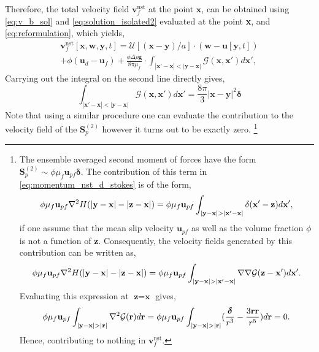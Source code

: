 Therefore, the total velocity field $\textbf{v}^\text{nst}_f$ at the point $\textbf{x}$, can be obtained using \ref{eq:v_b_sol} and \ref{eq:solution_isolated2} evaluated at the point \textbf{x}, and  \ref{eq:reformulation}, which yields,  
\begin{multline}
    \textbf{v}^\text{nst}_f [\textbf{x},\textbf{w},\textbf{y},t]
    =
    \mathcal{U}[(\textbf{x} - \textbf{y})/a]\cdot 
    (\textbf{w}- \textbf{u}[\textbf{y},t])
    \\
    +
    \phi(\textbf{u}_d - \textbf{u}_f)
    + 
    \frac{\phi\Delta \rho \textbf{g}}{8\pi \mu_f}\cdot 
    \int_{|\textbf{x}'-\textbf{x}|< |\textbf{y}- \textbf{x}|}
    \mathcal{G}(\textbf{x},\textbf{x}')
    d\textbf{x}',
\end{multline}
Carrying out the integral on the second line directly gives,
\begin{equation}
    \int_{|\textbf{x}'-\textbf{x}|< |\textbf{y}- \textbf{x}|}
    \mathcal{G}(\textbf{x},\textbf{x}')
    d\textbf{x}'
    = \frac{8\pi}{3}|\textbf{x}- \textbf{y}|^2\bm\delta
\end{equation}
Note that using a similar procedure one can evaluate the contribution to the velocity field of the $\textbf{S}_p^{(2)}$ however it turns out to be exactly zero.
\footnote{
    The ensemble averaged second moment of forces have the form $\textbf{S}_p^{(2)} \sim \phi \mu_f \textbf{u}_{pf} \bm\delta$. 
    The contribution of this term in \ref{eq:momentum_nst_d_stokes} is of the form, 
    \begin{equation*}
        \phi \mu_f \textbf{u}_{pf} \mathbf{\nabla}^2  H(|\textbf{y}- \textbf{x}| - |\textbf{z} -\textbf{x}|)
        =  \phi \mu_f \textbf{u}_{pf} \int_{|\textbf{y} - \textbf{x}| > |\textbf{x}' - \textbf{x}|}
        \delta(\textbf{x}'-\textbf{z})
        d\textbf{x}',
    \end{equation*}
    if one assume that the mean slip velocity $\textbf{u}_{pf}$ as well as the volume fraction $\phi$ is not a function of \textbf{z}. 
    Consequently, the velocity fields generated by this contribution can be written as, 
    \begin{equation*}
        \phi \mu_f \textbf{u}_{pf} \mathbf{\nabla}^2  H(|\textbf{y}- \textbf{x}| - |\textbf{z} -\textbf{x}|)
        =  \phi \mu_f \textbf{u}_{pf} \int_{|\textbf{y} - \textbf{x}| > |\textbf{x}' - \textbf{x}|}
        \mathbf{\nabla}\mathbf{\nabla}\mathcal{G}(\textbf{z} - \textbf{x}')
        d\textbf{x}'. 
    \end{equation*}     
    Evaluating this expression at $\textbf{z} = \textbf{x}$ gives, 
    \begin{equation*}
        \phi \mu_f \textbf{u}_{pf} \int_{|\textbf{y} - \textbf{x}| > |\textbf{r}|}
        \mathbf{\nabla}^2\mathcal{G}(\textbf{r})
        d\textbf{r} 
        = 
        \phi \mu_f \textbf{u}_{pf} \int_{|\textbf{y} - \textbf{x}| > |\textbf{r}|}
        (\frac{\bm\delta}{r^3} - \frac{3\textbf{rr}}{r^5})
        d\textbf{r} 
        = 0. 
    \end{equation*}     
    Hence, contributing to nothing in $\textbf{v}_f^\text{nst}$.
} 

